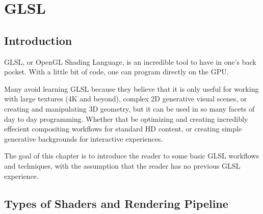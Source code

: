 \cleardoublepage
\chapter{GLSL}
\label{ch:12}


\section{Introduction}

\begin{fullwidth}
GLSL, or OpenGL Shading Language, is an incredible tool to have in one's back pocket. With a little bit of code, one can program directly on the GPU.

Many avoid learning GLSL because they believe that it is only useful for working with large textures (4K and beyond), complex 2D generative visual scenes, or creating and manipulating 3D geometry, but it can be used in so many facets of day to day programming. Whether that be optimizing and creating incredibly effecient compositing workflows for standard HD content, or creating simple generative backgrounds for interactive experiences.

The goal of this chapter is to introduce the reader to some basic GLSL workflows and techniques, with the assumption that the reader has no previous GLSL experience.

\end{fullwidth}


\section{Types of Shaders and Rendering Pipeline}

